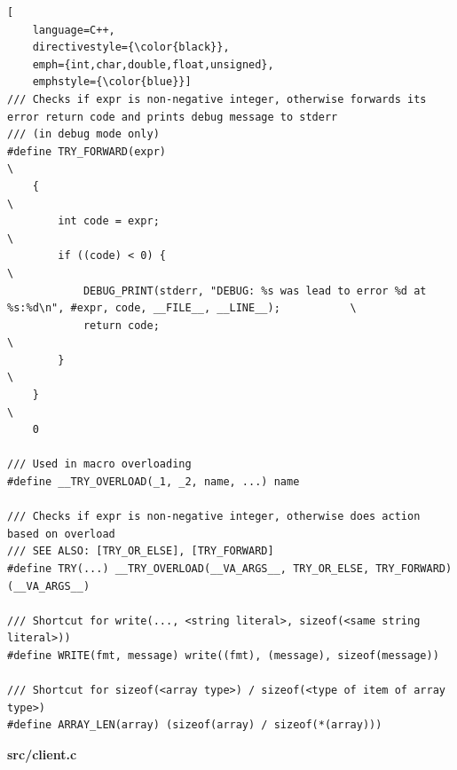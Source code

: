 \begin{lstlisting}[
    language=C++,
    directivestyle={\color{black}}, 
    emph={int,char,double,float,unsigned}, 
    emphstyle={\color{blue}}]
/// Checks if expr is non-negative integer, otherwise forwards its error return code and prints debug message to stderr
/// (in debug mode only)
#define TRY_FORWARD(expr)                                                                                              \
    {                                                                                                                  \
        int code = expr;                                                                                               \
        if ((code) < 0) {                                                                                              \
            DEBUG_PRINT(stderr, "DEBUG: %s was lead to error %d at %s:%d\n", #expr, code, __FILE__, __LINE__);           \
            return code;                                                                                               \
        }                                                                                                              \
    }                                                                                                                  \
    0

/// Used in macro overloading
#define __TRY_OVERLOAD(_1, _2, name, ...) name

/// Checks if expr is non-negative integer, otherwise does action based on overload
/// SEE ALSO: [TRY_OR_ELSE], [TRY_FORWARD]
#define TRY(...) __TRY_OVERLOAD(__VA_ARGS__, TRY_OR_ELSE, TRY_FORWARD)(__VA_ARGS__)

/// Shortcut for write(..., <string literal>, sizeof(<same string literal>))
#define WRITE(fmt, message) write((fmt), (message), sizeof(message))

/// Shortcut for sizeof(<array type>) / sizeof(<type of item of array type>)
#define ARRAY_LEN(array) (sizeof(array) / sizeof(*(array)))
\end{lstlisting}

\textbf{src/client.c}

